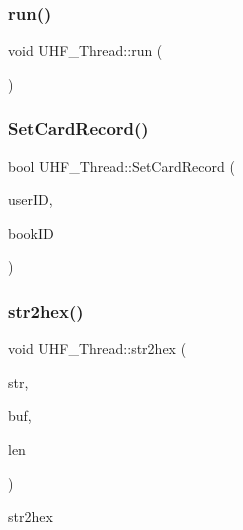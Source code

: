 \mbox{\label{class_u_h_f___thread_a7ae2a5c0bae9b20e0fbc315febefb818}} 
\subsubsection{\texorpdfstring{run()}{run()}}
{\footnotesize\ttfamily void U\+H\+F\+\_\+\+Thread\+::run (\begin{DoxyParamCaption}{ }\end{DoxyParamCaption})\hspace{0.3cm}{\ttfamily [protected]}}

\mbox{\label{class_u_h_f___thread_a1ec4510fd4d722b34d6cd33c3820f897}} 
\subsubsection{\texorpdfstring{SetCardRecord()}{SetCardRecord()}}
{\footnotesize\ttfamily bool U\+H\+F\+\_\+\+Thread\+::\+Set\+Card\+Record (\begin{DoxyParamCaption}\item[{Q\+String}]{user\+ID,  }\item[{Q\+String}]{book\+ID }\end{DoxyParamCaption})}

\mbox{\label{class_u_h_f___thread_aa7aa23919d844f6da517ecec5747bed5}} 
\subsubsection{\texorpdfstring{str2hex()}{str2hex()}}
{\footnotesize\ttfamily void U\+H\+F\+\_\+\+Thread\+::str2hex (\begin{DoxyParamCaption}\item[{const Q\+String \&}]{str,  }\item[{quint8 $\ast$}]{buf,  }\item[{quint8}]{len }\end{DoxyParamCaption})}



str2hex 


